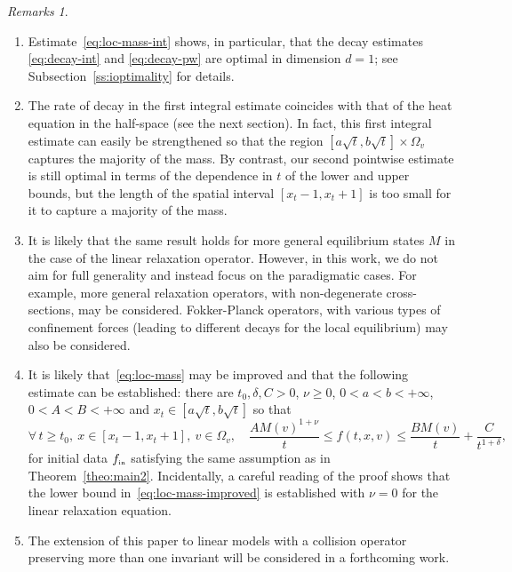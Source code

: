 \documentclass[11pt]{amsart}
\theoremstyle{definition}
\theoremstyle{remark}
\newtheorem{remarks}[theorem]{Remarks}
\numberwithin{equation}{section}
\newcommand{\init}{\text{{\tiny {\rm in}}}}
\begin{document}
\begin{remarks}
  \begin{enumerate}
  \item Estimate~\eqref{eq:loc-mass-int} shows, in particular, that the decay estimates \eqref{eq:decay-int} and \eqref{eq:decay-pw} are optimal in dimension $d=1$; see Subsection~\ref{ss:ioptimality} for details.
  \item The rate of decay in the first integral estimate coincides with that of the heat equation in the half-space (see the next section). In fact, this first integral estimate can easily be strengthened so that the region $[a \sqrt{t},b \sqrt{t}] \times \Omega_v$ captures the majority of the mass. By contrast, our second pointwise estimate is still optimal in terms of the dependence in $t$ of the lower and upper bounds, but the length of the spatial interval $[x_t-1,x_t+1]$ is too small for it to capture a majority of the mass.
  \item It is likely that the same result holds for more general equilibrium states $M$ in the case of the linear relaxation operator. However, in this work, we do not aim for full generality and instead focus on the paradigmatic cases. For example, more general relaxation operators, with non-degenerate cross-sections, may be considered. Fokker-Planck operators, with various types of confinement forces (leading to different decays for the local equilibrium) may also be considered.
  \item It is likely that~\eqref{eq:loc-mass} may be improved and that the following estimate can be established:  there are $t_0,\delta,C> 0$, $\nu \ge 0$, $0<a<b<+\infty$, $0<A<B<+\infty$ and $x_t \in \left[a \sqrt{t},b \sqrt{t}\right]$ so that
   \begin{equation}
     \label{eq:loc-mass-improved}
     \forall \, t \ge t_0, \ x \in \left[x_t-1,x_t+1\right], \ v \in \Omega_v, \quad \frac{A M(v)^{1+\nu}}{t} \le f(t,x,v) \le \frac{B M(v)}{t} + \frac{C}{t^{1+\delta}},
   \end{equation}
   for initial data $f_{\init}$ satisfying the same assumption as in Theorem~\ref{theo:main2}.  Incidentally, a careful reading of the proof shows that the lower bound in~\eqref{eq:loc-mass-improved} is established with $\nu=0$ for the linear relaxation equation.
   \item The extension of this paper to linear models with a collision operator preserving more than one invariant will be considered in a forthcoming work. 
 \end{enumerate}
\end{remarks}
\end{document}
